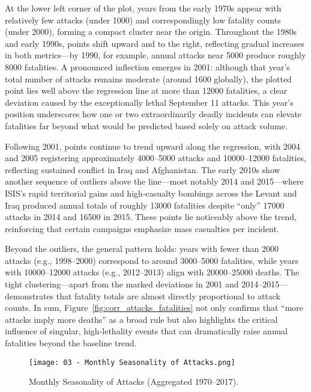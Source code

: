 At the lower left corner of the plot, years from the early 1970s appear with relatively few attacks (under 1000) and correspondingly low fatality counts (under 2000), forming a compact cluster near the origin. Throughout the 1980s and early 1990s, points shift upward and to the right, reflecting gradual increases in both metrics—by 1990, for example, annual attacks near 5000 produce roughly 8000 fatalities. A pronounced inflection emerges in 2001: although that year’s total number of attacks remains moderate (around 1600 globally), the plotted point lies well above the regression line at more than 12000 fatalities, a clear deviation caused by the exceptionally lethal September 11 attacks. This year’s position underscores how one or two extraordinarily deadly incidents can elevate fatalities far beyond what would be predicted based solely on attack volume.

Following 2001, points continue to trend upward along the regression, with 2004 and 2005 registering approximately 4000–5000 attacks and 10000–12000 fatalities, reflecting sustained conflict in Iraq and Afghanistan. The early 2010s show another sequence of outliers above the line—most notably 2014 and 2015—where ISIS’s rapid territorial gains and high‐casualty bombings across the Levant and Iraq produced annual totals of roughly 13000 fatalities despite “only” 17000 attacks in 2014 and 16500 in 2015. These points lie noticeably above the trend, reinforcing that certain campaigns emphasize mass casualties per incident.

Beyond the outliers, the general pattern holds: years with fewer than 2000 attacks (e.g., 1998–2000) correspond to around 3000–5000 fatalities, while years with 10000–12000 attacks (e.g., 2012–2013) align with 20000–25000 deaths. The tight clustering—apart from the marked deviations in 2001 and 2014–2015—demonstrates that fatality totals are almost directly proportional to attack counts. In sum, Figure~\ref{fig:corr_attacks_fatalities} not only confirms that “more attacks imply more deaths” as a broad rule but also highlights the critical influence of singular, high‐lethality events that can dramatically raise annual fatalities beyond the baseline trend.  

\vspace{0.5em}
\begin{figure}[ht]
  \centering
  \texttt{[image: 03 - Monthly Seasonality of Attacks.png]}
  \caption{Monthly Seasonality of Attacks (Aggregated 1970–2017).}
  \label{fig:monthly_seasonality}
\end{figure}


